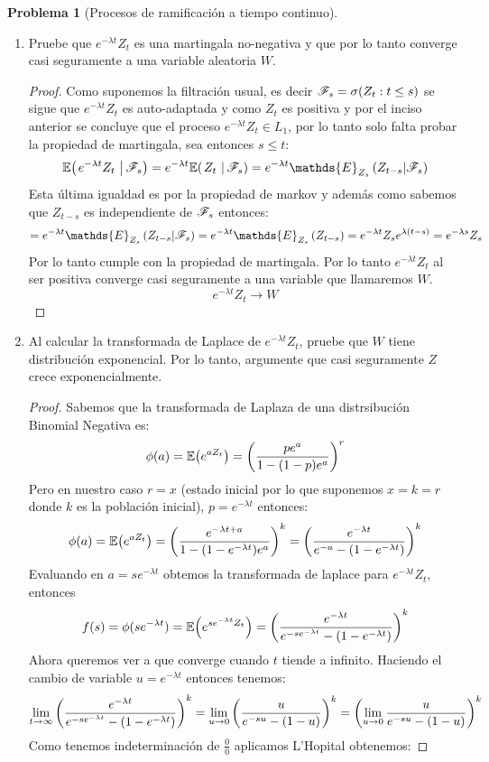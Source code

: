 \documentclass[a5paper,oneside]{amsart}
\theoremstyle{plain}
\theoremstyle{definition}
\newtheorem{problema}{Problema}
\begin{document}
\begin{problema}[Procesos de ramificaci\'on a tiempo continuo]
\begin{enumerate}
\item Pruebe que $e^{-\lambda t}Z_t$ es una martingala no-negativa y que por lo tanto converge casi seguramente a una variable aleatoria $W$.
\begin{proof}
Como suponemos la filtraci\'on usual, es decir $\mathscr{F}_s=\sigma(Z_t:t\leq s)$ se sigue que    $e^{-\lambda t}Z_t$ es auto-adaptada  y como $Z_t$ es positiva y por el inciso anterior se concluye que el proceso $e^{-\lambda t}Z_t \in L_1$, por lo tanto solo falta probar la propiedad de martingala, sea entonces $s\leq t$:
$$
\espc{e^{-\lambda t }Z_t}{\F_s}=e^{-\lambda t}\espc{Z_t}{\F_s}=e^{-\lambda t}\mathds{E}_{Z_s}\paren{Z_{t-s}|\F_s}
$$
Esta \'ultima igualdad es por la propiedad de markov y adem\'as como  sabemos que $Z_{t-s}$  es independiente de $\mathscr{F}_s$ entonces:
$$
=e^{-\lambda t}\mathds{E}_{Z_s}\paren{Z_{t-s}|\F_s}=e^{-\lambda t}\mathds{E}_{Z_s}\paren{Z_{t-s}}=e^{-\lambda t}Z_se^{\lambda(t-s)}=e^{-\lambda s}Z_s
$$
Por lo tanto cumple con la propiedad de martingala. Por lo tanto $e^{-\lambda t}Z_t$  al ser positiva converge casi seguramente a una variable que llamaremos $W$.
$$
e^{-\lambda t}Z_t \rightarrow W
$$
 \end{proof}
\item Al calcular la transformada de Laplace de $e^{-\lambda t}Z_t$, pruebe que $W$ tiene distribuci\'on exponencial. Por lo tanto, argumente que casi seguramente $Z$ crece exponencialmente.
\begin{proof}
Sabemos que la transformada de Laplaza de una distrsibuci\'on Binomial Negativa es:
$$
\phi(a)=\mathbb{E}\! \left( e^{aZ_t} \right)=\left( \frac{pe^{a}}{1-(1-p)e^a}\right) ^r
$$
Pero en nuestro caso $r=x$ (estado inicial por lo que suponemos $x=k=r$ donde $k$ es la poblaci\'on inicial), $p=e^{-\lambda t}$ entonces:
$$
\phi(a)=\mathbb{E}\! \left( e^{aZ_t} \right)=\left( \frac{e^{-\lambda t+a}}{1-(1-e^{-\lambda t})e^a}\right) ^k=\left( \frac{e^{-\lambda t}}{e^{-a}-(1-e^{-\lambda t})}\right) ^k
$$
Evaluando en $a=s e^{ -\lambda t}$ obtemos la transformada de laplace para $e^{-\lambda t}Z_t$, entonces
$$
f(s)=\phi(se^{-\lambda t})=\mathbb{E}\! \left( e^{se^{ -\lambda t}Z_t} \right)=\left( \frac{e^{-\lambda t}}{e^{-se^{-\lambda t}}-(1-e^{-\lambda t})}\right) ^k
$$
Ahora queremos ver a que converge cuando $t$ tiende a infinito. Haciendo el cambio de variable $u= e^{-\lambda t}$ entonces tenemos:
$$
\lim_{t \rightarrow \infty}\left( \frac{e^{-\lambda t}}{e^{-se^{-\lambda t}}-(1-e^{-\lambda t})}\right) ^k=\lim_{u \rightarrow 0}\left( \frac{u}{e^{-su}-(1-u)}\right) ^k=\left( \lim_{u \rightarrow 0}\frac{u}{e^{-su}-(1-u)}\right) ^k
$$
Como tenemos indeterminaci\'on de $\frac{0}{0}$ aplicamos L'Hopital obtenemos:

\end{proof}
\end{enumerate}
\end{problema}
\end{document}
